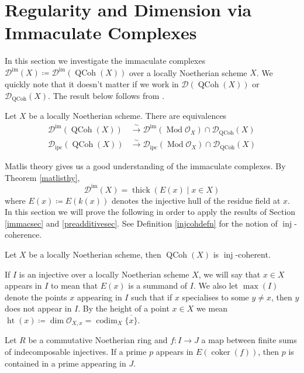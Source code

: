 \documentclass[12pt,oneside]{amsart}
\DeclareMathOperator*{\coker}{coker}
\DeclareMathOperator{\thick}{thick}
\DeclareMathOperator{\Mod}{Mod}
\DeclareMathOperator{\QCoh}{QCoh}
\DeclareMathOperator{\inj}{inj}
\DeclareMathOperator{\immac}{im}
\DeclareMathOperator{\ipscoh}{ipc}
\DeclareMathOperator{\codim}{codim}
\DeclareMathOperator{\hgt}{ht}
\begin{document}
\section{Regularity and Dimension via Immaculate Complexes}
\label{immaculateschemes}

In this section we investigate the immaculate complexes $\mathcal{D}^{\immac}(X) \coloneq \mathcal{D}^{\immac}(\QCoh(X))$ over a locally Noetherian scheme $X$. We quickly note that it doesn't matter if we work in $\mathcal{D}(\QCoh(X))$ or $\mathcal{D}_{\QCoh}(X)$. The result below follows from \cite[Corollary 7.19]{Har66}.

\begin{prop}
Let $X$ be a locally Noetherian scheme. There are equivalences
\begin{align*}
\mathcal{D}^{\immac}(\QCoh(X)) & \xrightarrow{\sim} \mathcal{D}^{\immac}(\Mod \mathcal{O}_X) \cap \mathcal{D}_{\QCoh}(X) \\
\mathcal{D}_{\ipscoh}(\QCoh(X)) & \xrightarrow{\sim} \mathcal{D}_{\ipscoh}(\Mod \mathcal{O}_X) \cap \mathcal{D}_{\QCoh}(X) 
\end{align*}
\end{prop}

Matlis theory gives us a good understanding of the immaculate complexes. By Theorem \ref{matlisthy},
\[
\mathcal{D}^{\immac}(X) = \thick(E(x) \mid x \in X )
\]
where $E(x) \coloneq E(k(x))$ denotes the injective hull of the residue field at $x$. In this section we will prove the following in order to apply the results of Section \ref{immacsec} and \ref{preadditivesec}. See Definition \ref{injcohdefn}
for the notion of $\inj$-coherence.


\begin{theorem} \label{injcohscheme}
Let $X$ be a locally Noetherian scheme, then $\QCoh(X)$ is $\inj$-coherent.
\end{theorem}




\begin{notation} If $I$ is an injective over a locally Noetherian scheme $X$, we will say that $x \in X$ appears in $I$ to mean that $E(x)$ is a summand of $I$. We also let $\max(I)$ denote the points $x$ appearing in $I$ such that if $x$ specialises to some $y \neq x$, then $y$ does not appear in $I$. By the height of a point $x \in X$ we mean $ \hgt(x) \coloneq \dim \mathcal{O}_{X,x} = \codim_X \overline{\{x\}}$. 
\end{notation}


\begin{lemma} \label{weakinjcohlemma}
Let $R$ be a commutative Noetherian ring and $f: I \to J$ a map between finite sums of indecomposable injectives. If a prime $p$ appears in $E(\coker(f))$, then $p$ is contained in a prime appearing in $J$.  
\end{lemma}
\end{document}
